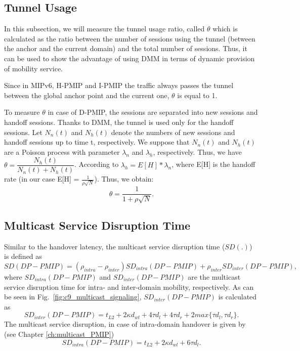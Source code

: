\subsection{Tunnel Usage}
In this subsection, we will measure the tunnel usage ratio, called $\theta$ which is calculated as the ratio between the number of sessions using the tunnel (between the anchor and the current domain) and the total number of sessions. Thus, it can be used to show the advantage of using DMM in terms of dynamic provision of mobility service. 

Since in MIPv6, H-PMIP and I-PMIP the traffic always passes the tunnel between the global anchor point and the current one, $\theta$ is equal to 1. 

To measure $\theta$ in case of D-PMIP, the sessions are separated into new sessions and handoff sessions. Thanks to DMM, the tunnel is used only for the handoff sessions. Let $N_{n}(t)$ and $N_{h}(t)$ denote the numbers of new sessions and handoff sessions up to time t, respectively. We suppose that $N_{n}(t)$ and $N_{h}(t)$ are a Poisson process with parameter $\lambda_{n}$ and $\lambda_{h}$, respectively. Thus, we have $\theta =\dfrac{N_{h}(t)}{N_{n}(t)+N_{h}(t)}$. According to \cite{prob} $\lambda_{h} = E[H] * \lambda_{n}$, where E[H] is the handoff rate (in our case E[H] = $\frac{1}{\rho\sqrt{N}}$). 
Thus, we obtain:
\begin{equation}
\theta = \dfrac{1}{ 1+ \rho\sqrt{N}}.       
\end{equation}

\subsection{Multicast Service Disruption Time}
Similar to the handover latency, the multicast service disruption time ($SD(.)$) is defined as\\
 \begin{equation}
SD(DP-PMIP)= \left( \rho_{intra} - \rho_{inter} \right) SD_{intra}(DP-PMIP) + \rho_{inter} SD_{inter}(DP-PMIP),
\end{equation}
where $SD_{intra}(DP-PMIP)$ and $SD_{inter}(DP-PMIP)$ are the multicast service disruption time for intra- and inter-domain mobility, respectively. As can be seen in Fig.~\ref{fig:c9_multicast_signaling}, $SD_{inter}(DP-PMIP)$ is calculated as\\
\begin{equation}
SD_{inter}(DP-PMIP) = t_{L2} + 2\kappa d_{wl} + 4\tau d_{l} + 4\tau d_{r} + 2 max \{ \tau d_{l}, \tau d_{r} \}. 
\end{equation}
The multicast service disruption, in case of intra-domain handover is given by (see Chapter \ref {ch:multicast_PMIP})
\begin{equation}
SD_{intra}(DP-PMIP) = t_{L2} + 2 \kappa d_{wl} + 6\tau d_{l}. 
\end{equation}

